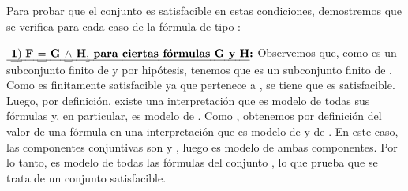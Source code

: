 \begin{isabellebody}
\begin{isamarkuptext}
\begin{demostracion}
    Para probar que el conjunto  es satisfacible en estas condiciones, demostremos 
    que se verifica para cada caso de la fórmula  de tipo \isa{{\isasymalpha}}:

      $\textbf{\isa{{\isasymone}{\isacharparenright}\ F\ {\isacharequal}\ G\ {\isasymand}\ H{\isacharcomma}\ para\ ciertas\ fórmulas\ G\ y\ H}:}$ Observemos que, como  es un subconjunto 
      finito de  y  por hipótesis, tenemos que  es un subconjunto finito de . 
      Como  es finitamente satisfacible ya que pertenece a , se tiene que  es 
      satisfacible. Luego, por definición, existe una interpretación \isa{{\isasymA}} que es modelo de todas sus 
      fórmulas y, en particular, \isa{{\isasymA}} es modelo de . Como , obtenemos por definición 
      del valor de una fórmula en una interpretación que \isa{{\isasymA}} es modelo de  y de . En este caso,
      las componentes conjuntivas son  y , luego \isa{{\isasymA}} es modelo de ambas componentes.
      Por lo tanto, \isa{{\isasymA}} es modelo de todas las fórmulas del conjunto , lo que prueba 
      que se trata de un conjunto satisfacible.


\end{demostracion}
\end{isamarkuptext}
\end{isabellebody}
